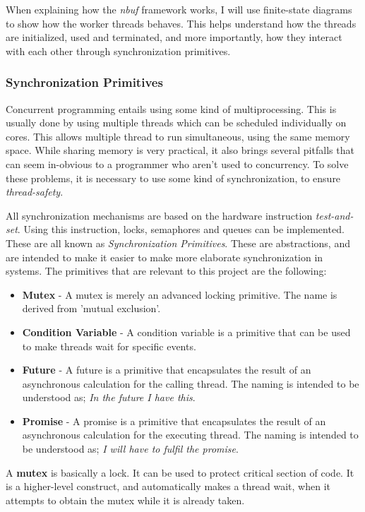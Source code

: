 \documentclass[a4paper]{article}
\newcommand{\nbuf}{\textit{nbuf} }
\begin{document}
When explaining how the \nbuf framework works, I will use finite-state diagrams to show how the worker threads behaves. This helps understand how the threads are initialized, used and terminated, and more importantly, how they interact with each other through synchronization primitives.


\subsubsection{Synchronization Primitives}
Concurrent programming entails using some kind of multiprocessing. This is usually done by using multiple threads which can be scheduled individually on cores. This allows multiple thread to run simultaneous, using the same memory space. While sharing memory is very practical, it also brings several pitfalls that can seem in-obvious to a programmer who aren't used to concurrency. To solve these problems, it is necessary to use some kind of synchronization, to ensure \textit{thread-safety}.

All synchronization mechanisms are based on the hardware instruction \textit{test-and-set}. Using this instruction, locks, semaphores and queues can be implemented. These are all known as \textit{Synchronization Primitives}. These are abstractions, and are intended to make it easier to make more elaborate synchronization in systems. The primitives that are relevant to this project are the following:

\begin{itemize}
\item \textbf{Mutex} - A mutex is merely an advanced locking primitive. The name is derived from 'mutual exclusion'.
\item \textbf{Condition Variable} - A condition variable is a primitive that can be used to make threads wait for specific events.
\item \textbf{Future} - A future is a primitive that encapsulates the result of an asynchronous calculation for the calling thread. The naming is intended to be understood as; \textit{In the future I have this}.
\item \textbf{Promise} - A promise is a primitive that encapsulates the result of an asynchronous calculation for the executing thread. The naming is intended to be understood as; \textit{I will have to fulfil the promise}.
\end{itemize}


A \textbf{mutex} is basically a lock. It can be used to protect critical section of code. It is a higher-level construct, and automatically makes a thread wait, when it attempts to obtain the mutex while it is already taken.\\
\end{document}
